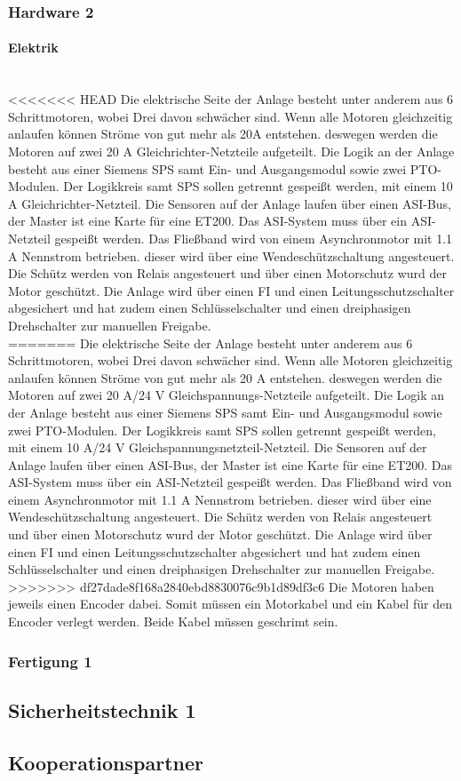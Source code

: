 \subsubsection{Hardware 2}

\paragraph{Elektrik}\mbox{}\\
<<<<<<< HEAD
Die elektrische Seite der Anlage besteht unter anderem aus 6 Schrittmotoren, wobei Drei davon schwächer sind. Wenn alle Motoren gleichzeitig anlaufen können Ströme von gut mehr als 20A entstehen. deswegen werden die Motoren auf zwei 20 A Gleichrichter-Netzteile aufgeteilt. Die Logik an der Anlage besteht aus einer Siemens SPS samt Ein- und Ausgangsmodul sowie zwei PTO-Modulen. Der Logikkreis samt SPS sollen getrennt gespeißt werden, mit einem 10 A Gleichrichter-Netzteil. Die Sensoren auf der Anlage laufen über einen ASI-Bus, der Master ist eine Karte für eine ET200. Das ASI-System muss über ein ASI-Netzteil gespeißt werden. Das Fließband wird von einem Asynchronmotor mit 1.1 A Nennstrom betrieben. dieser wird über eine Wendeschützschaltung angesteuert. Die Schütz werden von Relais angesteuert und über einen Motorschutz wurd der Motor geschützt. Die Anlage wird über einen FI und einen Leitungsschutzschalter abgesichert und hat zudem einen Schlüsselschalter und einen dreiphasigen Drehschalter zur manuellen Freigabe.\\
=======
Die elektrische Seite der Anlage besteht unter anderem aus 6 Schrittmotoren, wobei Drei davon schwächer sind. Wenn alle Motoren gleichzeitig anlaufen können Ströme von gut mehr als 20 A entstehen. deswegen werden die Motoren auf zwei 20 A/24 V Gleichspannungs-Netzteile aufgeteilt. Die Logik an der Anlage besteht aus einer Siemens SPS samt Ein- und Ausgangsmodul sowie zwei PTO-Modulen. Der Logikkreis samt SPS sollen getrennt gespeißt werden, mit einem 10 A/24 V Gleichspannungsnetzteil-Netzteil. Die Sensoren auf der Anlage laufen über einen ASI-Bus, der Master ist eine Karte für eine ET200. Das ASI-System muss über ein ASI-Netzteil gespeißt werden. Das Fließband wird von einem Asynchronmotor mit 1.1 A Nennstrom betrieben. dieser wird über eine Wendeschützschaltung angesteuert. Die Schütz werden von Relais angesteuert und über einen Motorschutz wurd der Motor geschützt. Die Anlage wird über einen FI und einen Leitungsschutzschalter abgesichert und hat zudem einen Schlüsselschalter und einen dreiphasigen Drehschalter zur manuellen Freigabe.\\
>>>>>>> df27dade8f168a2840ebd8830076c9b1d89df3c6
Die Motoren haben jeweils einen Encoder dabei. Somit müssen ein Motorkabel und ein Kabel für den Encoder verlegt werden. Beide Kabel müssen geschrimt sein. 

\subsubsection{Fertigung 1}

\subsection{Sicherheitstechnik 1}

\subsection{Kooperationspartner}